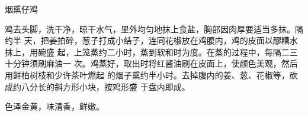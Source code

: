 %
%
%
%
%
%
%
\begin{recipe}{烟熏仔鸡}

\ingredients


\preparation

鸡去头脚，洗干净，晾干水气，里外均匀地抹上食盐，胸部因肉厚要适当多抹。隔约半
天，把姜拍碎，葱子打成小结子，连同花椒放在鸡腹内，鸡的皮面以醪糟水抹上，用碗盛
起，上笼蒸约二小时，蒸到软和时为度。在蒸的过程中，每隔二三十分钟须刷麻油一
次。鸡蒸好，取出时将红酱油刷在皮面上，使颜色美观，然后用鲜柏树枝和少许茶叶燃起
的烟子熏约半小时。去掉腹内的姜、葱、花椒等，砍成约八分长的斜方形小块，按鸡形盛
于盘内即成。

\features

色泽金黄，味清香，鲜嫩。

\end{recipe}

